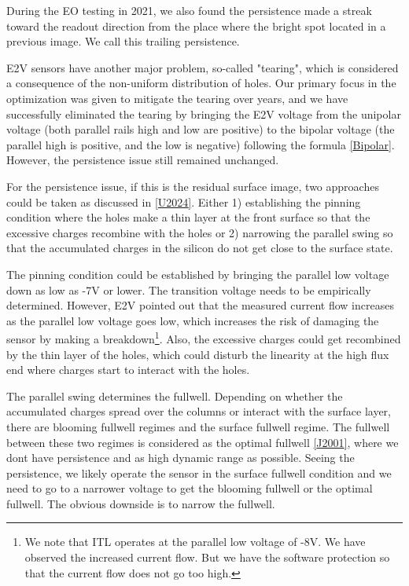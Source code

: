 During the EO testing in 2021, we also found the persistence made a
streak toward the readout direction from the place where the bright spot
located in a previous image. We call this trailing persistence.

E2V sensors have another major problem, so-called "tearing", which is
considered a consequence of the non-uniform distribution of holes. Our
primary focus in the optimization was given to mitigate the tearing over
years, and we have successfully eliminated the tearing by bringing the
E2V voltage from the unipolar voltage (both parallel rails high and low
are positive) to the bipolar voltage (the parallel high is positive, and
the low is negative) following the formula
\hyperref[Bipolar]{{[}Bipolar{]}}. However, the persistence issue still
remained unchanged.

For the persistence issue, if this is the residual surface image, two
approaches could be taken as discussed in \hyperref[U2024]{{[}U2024{]}}.
Either 1) establishing the pinning condition where the holes make a thin
layer at the front surface so that the excessive charges recombine with
the holes or 2) narrowing the parallel swing so that the accumulated
charges in the silicon do not get close to the surface state.

The pinning condition could be established by bringing the parallel low
voltage down as low as -7V or lower. The transition voltage needs to be
empirically determined. However, E2V pointed out that the measured
current flow increases as the parallel low voltage goes low, which
increases the risk of damaging the sensor by making a
breakdown\footnote{We note that ITL operates at the parallel low voltage
  of -8V. We have observed the increased current flow. But we have the
  software protection so that the current flow does not go too high.}.
Also, the excessive charges could get recombined by the thin layer of
the holes, which could disturb the linearity at the high flux end where
charges start to interact with the holes.

The parallel swing determines the fullwell. Depending on whether the
accumulated charges spread over the columns or interact with the surface
layer, there are blooming fullwell regimes and the surface fullwell
regime. The fullwell between these two regimes is considered as the
optimal fullwell \hyperref[J2001]{{[}J2001{]}}, where we
don\textquotesingle t have persistence and as high dynamic range as
possible. Seeing the persistence, we likely operate the sensor in the
surface fullwell condition and we need to go to a narrower voltage to
get the blooming fullwell or the optimal fullwell. The obvious downside
is to narrow the fullwell.

